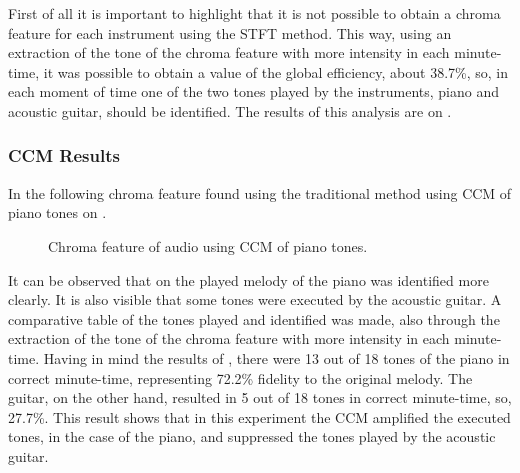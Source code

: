 \documentclass{article}
\begin{document}
	First of all it is important to highlight that it is not possible to obtain a chroma feature for each instrument using the STFT method. This way, using an extraction of the tone of the chroma feature with more intensity in each minute-time, it was possible to obtain a value of the global efficiency, about 38.7\%, so, in each moment of time one of the two tones played by the instruments, piano and acoustic guitar, should be identified. The results of this analysis are on .

	\subsubsection{CCM Results}
	In the following chroma feature found using the traditional method using CCM of piano tones on .
	
	\begin{figure}[h!]
	 \centerline{}
	 \caption{Chroma feature of audio using CCM of piano tones.}
	 \label{fig:2-ccm-piano}
	\end{figure}	

	It can be observed that on  the played melody of the piano was identified more clearly. It is also visible that some tones were executed by the acoustic guitar. A comparative table of the tones played and identified was made, also through the extraction of the tone of the chroma feature with more intensity in each minute-time. Having in mind the results of , there were 13 out of 18 tones of the piano in correct minute-time, representing 72.2\% fidelity to the original melody. The guitar, on the other hand, resulted in 5 out of 18 tones in correct minute-time, so, 27.7\%. This result shows that in this experiment the CCM amplified the executed tones, in the case of the piano, and suppressed the tones played by the acoustic guitar. 
\end{document}
